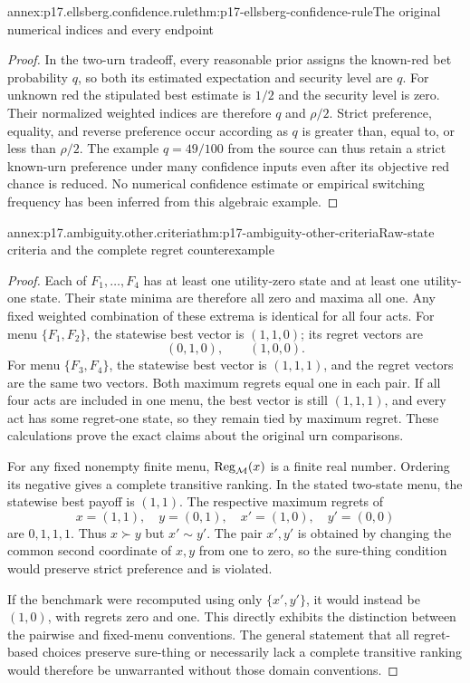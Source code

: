 \begin{annexitem}{annex:p17.ellsberg.confidence.rule}{thm:p17-ellsberg-confidence-rule}{The original numerical indices and every endpoint}
\begin{proof}
In the two-urn tradeoff, every
reasonable prior assigns the
known-red bet probability \(q\),
so both its estimated expectation
and security level are \(q\).
For unknown red the stipulated
best estimate is \(1/2\) and
the security level is zero.
Their normalized weighted indices
are therefore \(q\) and \(\rho/2\).
Strict preference, equality, and
reverse preference occur according
as \(q\) is greater than, equal to,
or less than \(\rho/2\).
The example \(q=49/100\) from the
source can thus retain a strict
known-urn preference under many
confidence inputs even after its
objective red chance is reduced.
No numerical confidence estimate
or empirical switching frequency
has been inferred from this
algebraic example.
\end{proof}
\end{annexitem}

\begin{annexitem}{annex:p17.ambiguity.other.criteria}{thm:p17-ambiguity-other-criteria}{Raw-state criteria and the complete regret counterexample}
\begin{proof}
Each of \(F_1,\ldots,F_4\) has
at least one utility-zero state
and at least one utility-one state.
Their state minima are therefore
all zero and maxima all one.
Any fixed weighted combination
of these extrema is identical
for all four acts.
For menu \(\{F_1,F_2\}\), the
statewise best vector is \((1,1,0)\);
its regret vectors are
\[
                     (0,1,0),\qquad(1,0,0).
\]
For menu \(\{F_3,F_4\}\), the
statewise best vector is \((1,1,1)\),
and the regret vectors are the
same two vectors. Both maximum
regrets equal one in each pair.
If all four acts are included
in one menu, the best vector is
still \((1,1,1)\), and every act
has some regret-one state, so
they remain tied by maximum
regret. These calculations prove
the exact claims about the
original urn comparisons.

For any fixed nonempty finite
menu, \({\rm Reg}_{\mathcal M}(x)\)
is a finite real number.
Ordering its negative gives a
complete transitive ranking.
In the stated two-state menu,
the statewise best payoff is
\((1,1)\). The respective maximum
regrets of
\[
             x=(1,1),\quad y=(0,1),\quad
             x'=(1,0),\quad y'=(0,0)
\]
are \(0,1,1,1\).
Thus \(x\succ y\) but \(x'\sim y'\).
The pair \(x',y'\) is obtained
by changing the common second
coordinate of \(x,y\) from one
to zero, so the sure-thing
condition would preserve strict
preference and is violated.

If the benchmark were recomputed
using only \(\{x',y'\}\), it
would instead be \((1,0)\), with
regrets zero and one. This
directly exhibits the distinction
between the pairwise and fixed-menu
conventions. The general statement
that all regret-based choices
preserve sure-thing or necessarily
lack a complete transitive ranking
would therefore be unwarranted
without those domain conventions.
\end{proof}
\end{annexitem}
